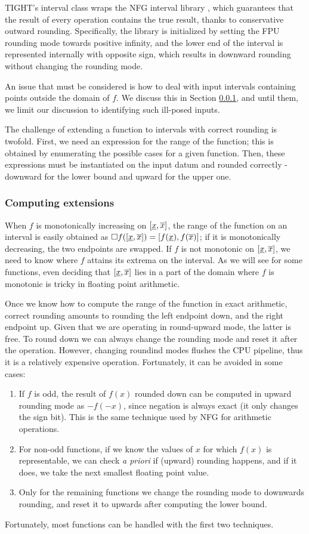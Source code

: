 TIGHT's interval class wraps the NFG interval library \cite{nfg}, which guarantees that the result of every operation contains the true result, thanks to conservative outward rounding. Specifically, the library is initialized by setting the FPU rounding mode towards positive infinity, and the lower end of the interval is represented internally with opposite sign, which results in downward rounding without changing the rounding mode.

An issue that must be considered is how to deal with input intervals containing points outside the domain of $f$. We discuss this in Section \ref{}, and until them, we limit our discussion to identifying such ill-posed inputs.

The challenge of extending a function to intervals with correct rounding is twofold.
First, we need an expression for the range of the function; this is obtained by enumerating the possible cases for a given function.
Then, these expressions must be instantiated on the input datum and rounded correctly - downward for the lower bound and upward for the upper one.

\subsubsection{Computing extensions}
When $f$ is monotonically increasing on $[\underline{x}, \overline{x}]$, the range of the function on an interval is easily obtained as $\Box f([\underline{x}, \overline{x}]) = [f(\underline{x}), f(\overline{x})]$; if it is monotonically decreasing, the two endpoints are swapped.
If $f$ is not monotonic on $[\underline{x}, \overline{x}]$, we need to know where $f$ attains its extrema on the interval. As we will see for some functions, even deciding that $[\underline{x}, \overline{x}]$ lies in a part of the domain where $f$ is monotonic is tricky in floating point arithmetic.

Once we know how to compute the range of the function in exact arithmetic, correct rounding amounts to rounding the left endpoint down, and the right endpoint up. Given that we are operating in round-upward mode, the latter is free.
To round down we can always change the rounding mode and reset it after the operation. However, changing roundind modes flushes the CPU pipeline, thus it is a relatively expensive operation.
Fortunately, it can be avoided in some cases:
\begin{enumerate}
	\item If $f$ is odd, the result of $f(x)$ rounded down can be computed in upward rounding mode as $-f(-x)$, since negation is always exact (it only changes the sign bit). This is the same technique used by NFG for arithmetic operations.
	\item For non-odd functions, if we know the values of $x$ for which $f(x)$ is representable, we can check \emph{a priori} if (upward) rounding happens, and if it does, we take the next smallest floating point value.
	\item Only for the remaining functions we change the rounding mode to downwards rounding, and reset it to upwards after computing the lower bound.
\end{enumerate}
Fortunately, most functions can be handled with the first two techniques.

